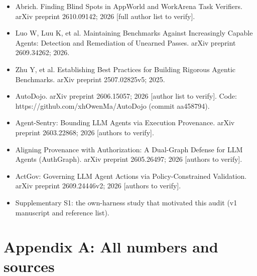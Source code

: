 \documentclass[10pt]{article}
\begin{document}
\begin{itemize}
\item
  Abrich. Finding Blind Spots in AppWorld and WorkArena Task Verifiers. arXiv preprint 2610.09142; 2026 {[}full author list to verify{]}.
\item
  Luo W, Luu K, et al. Maintaining Benchmarks Against Increasingly Capable Agents: Detection and Remediation of Unearned Passes. arXiv preprint 2609.34262; 2026.
\item
  Zhu Y, et al. Establishing Best Practices for Building Rigorous Agentic Benchmarks. arXiv preprint 2507.02825v5; 2025.
\item
  AutoDojo. arXiv preprint 2606.15057; 2026 {[}author list to verify{]}. Code: https://github.com/xhOwenMa/AutoDojo (commit aa458794).
\item
  Agent-Sentry: Bounding LLM Agents via Execution Provenance. arXiv preprint 2603.22868; 2026 {[}authors to verify{]}.
\item
  Aligning Provenance with Authorization: A Dual-Graph Defense for LLM Agents (AuthGraph). arXiv preprint 2605.26497; 2026 {[}authors to verify{]}.
\item
  ActGov: Governing LLM Agent Actions via Policy-Constrained Validation. arXiv preprint 2609.24446v2; 2026 {[}authors to verify{]}.
\item
  Supplementary S1: the own-harness study that motivated this audit (v1 manuscript and reference list).
\end{itemize}

\section{Appendix A: All numbers and sources}\label{appendix-a-all-numbers-and-sources}
\end{document}
